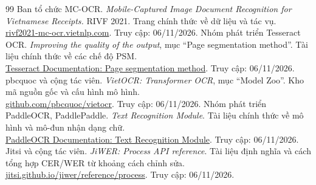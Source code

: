 \documentclass[11pt,a4paper]{article}
\begin{document}
\clearpage
\begin{thebibliography}{99}
\setlength{\itemsep}{10pt}
 Ban tổ chức MC-OCR. \textit{Mobile-Captured Image Document Recognition for Vietnamese Receipts.} RIVF 2021. Trang chính thức về dữ liệu và tác vụ.\\
\href{https://www.rivf2021-mc-ocr.vietnlp.com/}{\textsf{rivf2021-mc-ocr.vietnlp.com}}. Truy cập: 06/11/2026.
 Nhóm phát triển Tesseract OCR. \textit{Improving the quality of the output}, mục ``Page segmentation method''. Tài liệu chính thức về các chế độ PSM.\\
\href{https://tesseract-ocr.github.io/tessdoc/ImproveQuality.html\#page-segmentation-method}{\textsf{Tesseract Documentation: Page segmentation method}}. Truy cập: 06/11/2026.
 pbcquoc và cộng tác viên. \textit{VietOCR: Transformer OCR}, mục ``Model Zoo''. Kho mã nguồn gốc và cấu hình mô hình.\\
\href{https://github.com/pbcquoc/vietocr\#model-zoo}{\textsf{github.com/pbcquoc/vietocr}}. Truy cập: 06/11/2026.
 Nhóm phát triển PaddleOCR, PaddlePaddle. \textit{Text Recognition Module}. Tài liệu chính thức về mô hình và mô-đun nhận dạng chữ.\\
\href{https://www.paddleocr.ai/main/en/version3.x/module_usage/text_recognition.html}{\textsf{PaddleOCR Documentation: Text Recognition Module}}. Truy cập: 06/11/2026.
 Jitsi và cộng tác viên. \textit{JiWER: Process API reference}. Tài liệu định nghĩa và cách tổng hợp CER/WER từ khoảng cách chỉnh sửa.\\
\href{https://jitsi.github.io/jiwer/reference/process/}{\textsf{jitsi.github.io/jiwer/reference/process}}. Truy cập: 06/11/2026.
\end{thebibliography}
\end{document}
